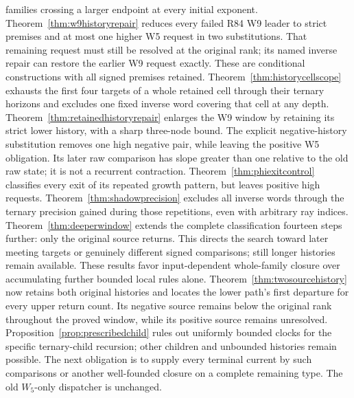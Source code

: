 \documentclass[11pt]{article}
\begin{document}
families crossing a larger endpoint at every initial exponent.
Theorem~\ref{thm:w9historyrepair} reduces every failed R84 W9 leader
to strict premises and at most one higher W5 request in two substitutions.
That remaining request must still be resolved at the original rank;
its named inverse repair can restore the earlier W9 request exactly.
These are conditional constructions with all signed premises retained.
Theorem~\ref{thm:historycellscope} exhausts the first four targets
of a whole retained cell through their ternary horizons and excludes
one fixed inverse word covering that cell at any depth.
Theorem~\ref{thm:retainedhistoryrepair} enlarges the W9 window by
retaining its strict lower history, with a sharp three-node bound.
The explicit negative-history substitution removes one high negative
pair, while leaving the positive W5 obligation. Its later raw comparison
has slope greater than one relative to the old raw state; it is not a
recurrent contraction. Theorem~\ref{thm:phiexitcontrol} classifies every
exit of its repeated growth pattern, but leaves positive high requests.
Theorem~\ref{thm:shadowprecision} excludes all inverse words through the
ternary precision gained during those repetitions, even with arbitrary
ray indices. Theorem~\ref{thm:deeperwindow} extends the complete
classification fourteen steps further: only the original source returns.
This directs the search toward later meeting targets or genuinely
different signed comparisons; still longer histories remain available.
These results
favor input-dependent whole-family closure over accumulating further
bounded local rules alone.
Theorem~\ref{thm:twosourcehistory} now retains both original histories
and locates the lower path's first departure for every upper return count.
Its negative source remains below the original rank throughout the
proved window, while its positive source remains unresolved.
Proposition~\ref{prop:prescribedchild} rules out uniformly bounded clocks
for the specific ternary-child recursion; other children and unbounded
histories remain possible.
The next obligation is to supply every
terminal current by such comparisons or another well-founded closure
on a complete remaining type. The old $W_5$-only dispatcher is unchanged.
\end{document}
